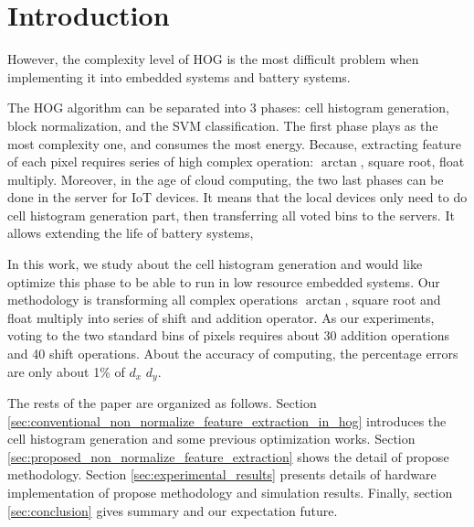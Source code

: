 %
%

\section{Introduction}
\label{sec:introduction}
However,  the complexity level of HOG is the most difficult problem when
implementing it into embedded systems and  battery systems.


The HOG algorithm can be separated into 3 phases: cell histogram generation,
block normalization, and the SVM classification.
The first phase plays as the most complexity one, and consumes the most energy.
Because, extracting feature of each pixel requires series of high complex
operation: $\arctan$, square root, float multiply.
Moreover, in the age of cloud computing, the two last phases can be done in the
server  for IoT devices.
It means that the local devices only need to do cell histogram generation part,
then transferring all voted bins to the servers.
It allows extending the life of battery systems,

In this work, we study about the cell histogram generation and would like optimize this
phase to be able to run in low resource embedded systems.
Our methodology  is transforming all complex operations $\arctan$, square root
and float multiply  into series of shift and addition operator.
As our experiments, voting to the two standard bins of pixels requires about 30 addition operations
and 40 shift operations.
About the accuracy of computing, the percentage errors are only about 1\% of
$d_x$ $d_y$.


The rests of the paper are organized as follows.
Section \ref{sec:conventional_non_normalize_feature_extraction_in_hog}
introduces the cell histogram generation and some previous optimization works.
Section \ref{sec:proposed_non_normalize_feature_extraction} shows the detail of
propose methodology.
Section \ref{sec:experimental_results} presents details of hardware
implementation of propose methodology and simulation results.
Finally, section \ref{sec:conclusion} gives summary and our expectation
future.
